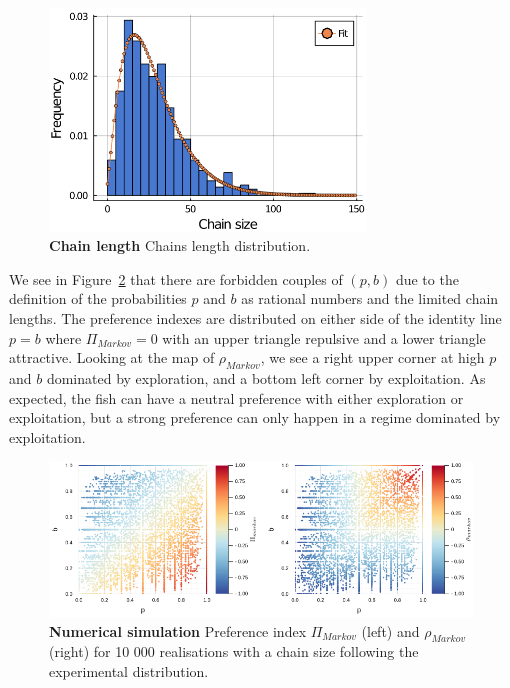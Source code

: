   \begin{figure}[htb]
    \centering
    \includegraphics[width=0.75\textwidth]{part_2/assets/chain_fit.png}
    \caption{\textbf{Chain length} Chains length distribution.}
    \label{chain_fit}
  \end{figure}

  We see in Figure~\ref{markov_simu} that there are forbidden couples of $(p,b)$ due to the definition of the probabilities $p$ and $b$ as rational numbers and the limited chain lengths. The preference indexes are distributed on either side of the identity line $p=b$ where $\Pi_{Markov} = 0$ with an upper triangle repulsive and a lower triangle attractive. Looking at the map of $\rho_{Markov}$, we see a right upper corner at high $p$ and $b$ dominated by exploration, and a bottom left corner by exploitation. As expected, the fish can have a neutral preference with either exploration or exploitation, but a strong preference can only happen in a regime dominated by exploitation.

  \begin{figure}[htb]
    \centering
    \includegraphics[width=1\textwidth]{part_2/assets/pi_pb.png}
    \caption{\textbf{Numerical simulation} Preference index $\Pi_{Markov}$ (left) and $\rho_{Markov}$ (right) for 10 000 realisations with a chain size following the experimental distribution.}
    \label{markov_simu}
  \end{figure}

